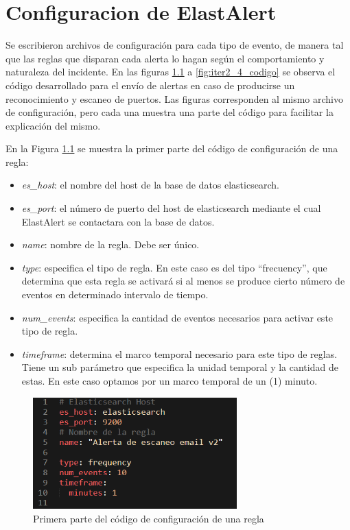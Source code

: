 \chapter{\Larger Configuracion de ElastAlert}
Se escribieron archivos de configuración para cada tipo de evento, de manera tal que las reglas que disparan cada alerta lo hagan según el comportamiento y naturaleza del incidente. En las figuras \ref{fig:iter2_1_codigo} a \ref{fig:iter2_4_codigo} se observa el código desarrollado para el envío de alertas en caso de producirse un reconocimiento y escaneo de puertos. Las figuras corresponden al mismo archivo de configuración, pero cada una muestra una parte del código para facilitar la explicación del mismo.\par
    En la Figura \ref{fig:iter2_1_codigo} se muestra la primer parte del código de configuración de una regla:
    \begin{itemize}
        \item \textit{es\_host}: el nombre del host de la base de datos elasticsearch.
        \item \textit{es\_port}: el número de puerto del host de elasticsearch mediante el cual ElastAlert se contactara con la base de datos.
        \item \textit{name}: nombre de la regla. Debe ser único.
        \item \textit{type}: especifica el tipo de regla. En este caso es del tipo “frecuency”, que determina que esta regla se activará si al menos se produce cierto número de eventos en determinado intervalo de tiempo.
        \item \textit{num\_events}: especifica la cantidad de eventos necesarios para activar este tipo de regla.
        \item \textit{timeframe}: determina el marco temporal necesario para este tipo de reglas. Tiene un sub parámetro que especifica la unidad temporal y la cantidad de estas. En este caso optamos por un marco temporal de un (1) minuto.
    \end{itemize}
    \begin{figure}[H]
    \centering
        \includegraphics[width=0.7\textwidth]{./iteracion_2_imagenes/3-codigoAlerta-1.png}
        \caption{Primera parte del código de configuración de una regla}
        \label{fig:iter2_1_codigo}
    \end{figure}
